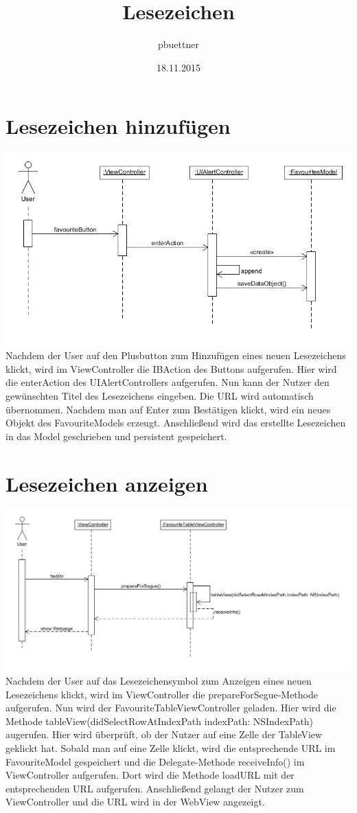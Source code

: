 \documentclass[a4paper,10pt]{article}
\title{Lesezeichen}
\author{pbuettner}
\date{18.11.2015}
\begin{document}
\maketitle
\tableofcontents
\pagebreak

\section{Lesezeichen hinzufügen}
\includegraphics[scale=0.5]{sequAddFavourites.png}
Nachdem der User auf den Plusbutton zum Hinzufügen eines neuen Lesezeichens klickt, wird im ViewController die IBAction des Buttons aufgerufen. Hier wird die enterAction des UIAlertControllers aufgerufen. Nun kann der Nutzer den gewünschten Titel des Lesezeichens eingeben. Die URL wird automatisch übernommen. Nachdem man auf Enter zum Bestätigen klickt, wird ein neues Objekt des FavouriteModels erzeugt. Anschließend wird das erstellte Lesezeichen in das Model geschrieben und persistent gespeichert.
\pagebreak

\section{Lesezeichen anzeigen}
\includegraphics[scale=0.45]{sequShowFavourites.png}
Nachdem der User auf das Lesezeichensymbol zum Anzeigen eines neuen Lesezeichens klickt, wird im ViewController die prepareForSegue-Methode aufgerufen. Nun wird der FavouriteTableViewController geladen. Hier wird die Methode tableView(didSelectRowAtIndexPath indexPath: NSIndexPath) augerufen. Hier wird überprüft, ob der Nutzer auf eine Zelle der TableView geklickt hat. Sobald man auf eine Zelle klickt, wird die entsprechende URL im FavouriteModel gespeichert und die Delegate-Methode receiveInfo() im ViewController aufgerufen. Dort wird die Methode loadURL mit der entsprechenden URL aufgerufen. Anschließend gelangt der Nutzer zum ViewController und die URL wird in der WebView angezeigt.
\pagebreak
\end{document}
